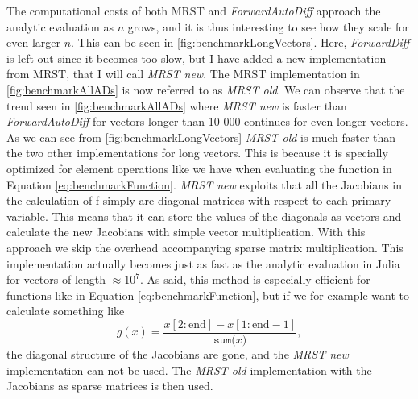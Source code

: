 The computational costs of both MRST and \textit{ForwardAutoDiff} approach the analytic evaluation as $n$ grows, and it is thus interesting to see how they scale for even larger $n$. This can be seen in \autoref{fig:benchmarkLongVectors}. Here, \textit{ForwardDiff} is left out since it becomes too slow, but I have added a new implementation from MRST, that I will call \textit{MRST new}. The MRST implementation in  \autoref{fig:benchmarkAllADs} is now referred to as \textit{MRST old}. We can observe that the trend seen in \autoref{fig:benchmarkAllADs} where \textit{MRST new} is faster than \textit{ForwardAutoDiff} for vectors longer than 10 000 continues for even longer vectors. As we can see from \autoref{fig:benchmarkLongVectors} \textit{MRST old} is much faster than the two other implementations for long vectors. This is because it is specially optimized for element operations like we have when evaluating the function in Equation \eqref{eq:benchmarkFunction}. \textit{MRST new} exploits that all the Jacobians in the calculation of f simply are diagonal matrices with respect to each primary variable. This means that it can store the values of the diagonals as vectors and calculate the new Jacobians with simple vector multiplication. With this approach we skip the overhead accompanying sparse matrix multiplication. This implementation actually becomes just as fast as the analytic evaluation in Julia for vectors of length $\approx 10^7$. As said, this method is especially efficient for functions like in Equation \eqref{eq:benchmarkFunction}, but if we for example want to calculate something like
\begin{equation}
g(x) = \frac{x\left[2:\text{end}\right] - x\left[1:\text{end}-1\right]}{\texttt{sum(}x\texttt{)}},
\label{eq:differenceFunction}
\end{equation}
the diagonal structure of the Jacobians are gone, and the \textit{MRST new} implementation can not be used. The \textit{MRST old} implementation with the Jacobians as sparse matrices is then used. 

